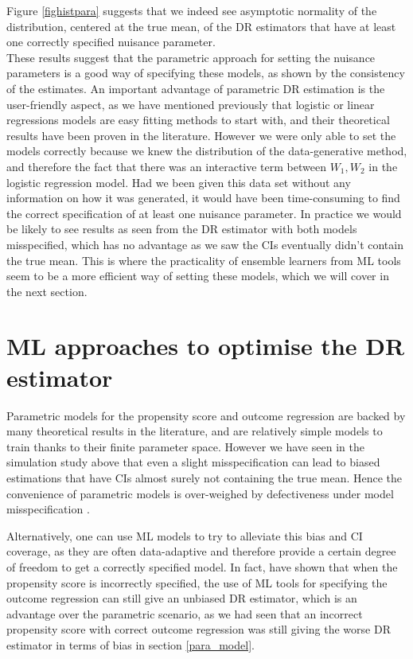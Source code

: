\documentclass[12pt,twoside]{article}
\begin{document}
Figure \ref{fighistpara} suggests that we indeed see asymptotic normality of the distribution, centered at the true mean, of the DR estimators that have at least one correctly specified nuisance parameter.\\

These results suggest that the parametric approach for setting the nuisance parameters is a good way of specifying these models, as shown by the consistency of the estimates. An important advantage of parametric DR estimation is the user-friendly aspect, as we have mentioned previously that logistic or linear regressions models are easy fitting methods to start with, and their theoretical results have been proven in the literature. However we were only able to set the models correctly because we knew the distribution of the data-generative method, and therefore the fact that there was an interactive term between $W_1,W_2$ in the logistic regression model. Had we been given this data set without any information on how it was generated, it would have been time-consuming to find the correct specification of at least one nuisance parameter. In practice we would be likely to see results as seen from the DR estimator with both models misspecified, which has no advantage as we saw the CIs eventually didn't contain the true mean. This is where the practicality of ensemble learners from ML tools seem to be a more efficient way of setting these models, which we will cover in the next section.

\clearpage
\section{ML approaches to optimise the DR estimator}

Parametric models for the propensity score and outcome regression are backed by many theoretical results in the literature, and are relatively simple models to train thanks to their finite parameter space. However we have seen in the simulation study above that even a slight misspecification can lead to biased estimations that have CIs almost surely not containing the true mean. Hence the convenience of parametric models is over-weighed by defectiveness under model misspecification \citep{diaz}.

Alternatively, one can use ML models to try to alleviate this bias and CI coverage, as they are often data-adaptive and therefore provide a certain degree of freedom to get a correctly specified model. In fact, \citet{ps_SL} have shown that when the propensity score is incorrectly specified, the use of ML tools for specifying the outcome regression can still give an unbiased DR estimator, which is an advantage over the parametric scenario, as we had seen that an incorrect propensity score with correct outcome regression was still giving the worse DR estimator in terms of bias in section \ref{para_model}.
\end{document}
